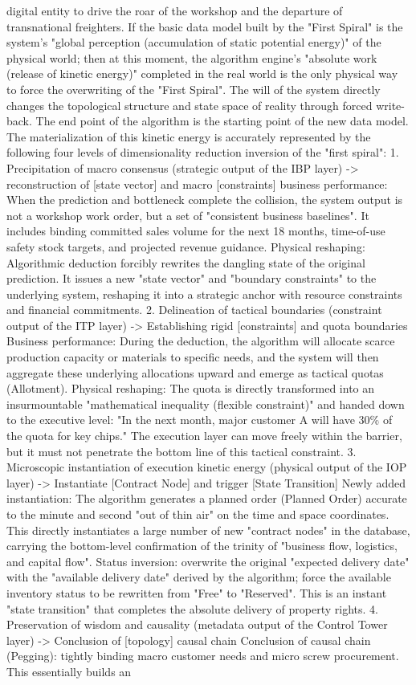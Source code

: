 \documentclass[11pt,a4paper]{article}
\begin{document}
digital entity to drive the roar of the workshop and the departure of transnational freighters. If the basic data model built by the "First Spiral" is the system's "global perception (accumulation of static potential energy)" of the physical world; then at this moment, the algorithm engine's "absolute work (release of kinetic energy)" completed in the real world is the only physical way to force the overwriting of the "First Spiral". The will of the system directly changes the topological structure and state space of reality through forced write-back. The end point of the algorithm is the starting point of the new data model. The materialization of this kinetic energy is accurately represented by the following four levels of dimensionality reduction inversion of the "first spiral": 1. Precipitation of macro consensus (strategic output of the IBP layer) -> reconstruction of [state vector] and macro [constraints] business performance: When the prediction and bottleneck complete the collision, the system output is not a workshop work order, but a set of "consistent business baselines". It includes binding committed sales volume for the next 18 months, time-of-use safety stock targets, and projected revenue guidance. Physical reshaping: Algorithmic deduction forcibly rewrites the dangling state of the original prediction. It issues a new "state vector" and "boundary constraints" to the underlying system, reshaping it into a strategic anchor with resource constraints and financial commitments. 2. Delineation of tactical boundaries (constraint output of the ITP layer) -> Establishing rigid [constraints] and quota boundaries Business performance: During the deduction, the algorithm will allocate scarce production capacity or materials to specific needs, and the system will then aggregate these underlying allocations upward and emerge as tactical quotas (Allotment). Physical reshaping: The quota is directly transformed into an insurmountable "mathematical inequality (flexible constraint)" and handed down to the executive level: "In the next month, major customer A will have 30\% of the quota for key chips." The execution layer can move freely within the barrier, but it must not penetrate the bottom line of this tactical constraint. 3. Microscopic instantiation of execution kinetic energy (physical output of the IOP layer) -> Instantiate [Contract Node] and trigger [State Transition] Newly added instantiation: The algorithm generates a planned order (Planned Order) accurate to the minute and second "out of thin air" on the time and space coordinates. This directly instantiates a large number of new "contract nodes" in the database, carrying the bottom-level confirmation of the trinity of "business flow, logistics, and capital flow". Status inversion: overwrite the original "expected delivery date" with the "available delivery date" derived by the algorithm; force the available inventory status to be rewritten from "Free" to "Reserved". This is an instant "state transition" that completes the absolute delivery of property rights. 4. Preservation of wisdom and causality (metadata output of the Control Tower layer) -> Conclusion of [topology] causal chain Conclusion of causal chain (Pegging): tightly binding macro customer needs and micro screw procurement. This essentially builds an 
\end{document}
